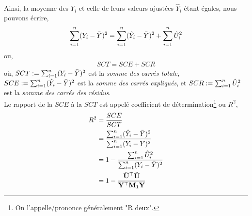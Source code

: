 Ainsi, la moyenne des $Y_i$ et celle de leurs valeurs ajustées $\hat{Y}_i$ étant égales, nous pouvons écrire,
\begin{align*}
\sum_{i=1}^n(Y_i-\bar{Y})^2 = \sum_{i=1}^n(\hat{Y}_i - \bar{Y})^2 + \sum_{i=1}^n \hat{U}_i^2
\end{align*}
ou,
\begin{align*}
SCT = SCE + SCR
\end{align*}
où,
$SCT := \sum_{i=1}^n(Y_i-\bar{Y})^2$ est la \emph{somme des carrés totale},  $SCE :=  \sum_{i=1}^n(\hat{Y}_i - \bar{Y})^2$  est la \emph{somme des carrés expliqués}, et $SCR:= \sum_{i=1}^n \hat{U}_i^2$ est la \emph{somme des carrés des résidus}.\\
Le rapport de la $SCE$ à la $SCT$ est appelé coefficient de détermination\footnote{On l'appelle/prononce généralement "R deux".} ou $R^2$,
\begin{align*}
R^2 &= \frac{SCE}{SCT}\\
& = \frac{ \sum_{i=1}^n(\hat{Y}_i - \bar{Y})^2}{\sum_{i=1}^n(Y_i-\bar{Y})^2}\\
&=1 - \frac{\sum_{i=1}^n \hat{U}_i^2}{\sum_{i=1}^n(Y_i-\bar{Y})^2}\\
& = 1 - \frac{\hat{\mathbf U}^\top\hat{\mathbf U}}{\mathbf Y^\top\mathbf M_1\mathbf Y}
\end{align*}
